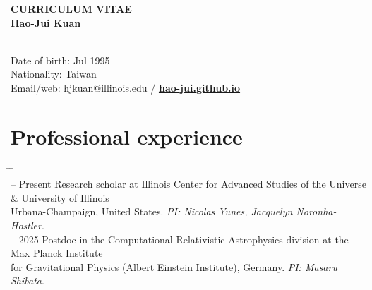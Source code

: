 \documentclass[10pt,floatfix,a4paper]{article}
\begin{document}
\begin{center}
  {\LARGE \bf CURRICULUM VITAE} \\[2ex]
  {\Large \bf Hao-Jui Kuan}
\end{center}

\begin{tabbing}
  \hspace*{0mm} \= \hspace*{2.3cm} \= \hspace*{10cm} \\[-3ex]
  \> Date of birth\hspace{1.2mm}:   Jul 1995\\
  \> Nationality\hspace{4mm}: \> Taiwan\\
  \> Email/web\hspace{4.3mm}: \> hjkuan@illinois.edu / \href{https://hao-jui.github.io}{\textbf{\textcolor{TuebingenRed}{hao-jui.github.io}}}
\end{tabbing}

\section*{Professional experience}
\begin{tabbing}
  \hspace*{5mm} \= \hspace*{2.3cm} \= \hspace*{10cm} \\[-3ex]
   -- Present \> Research scholar at Illinois Center for Advanced Studies of the Universe \& University of Illinois \\
  \> \> Urbana-Champaign, United States. \textit{PI: Nicolas Yunes, Jacquelyn Noronha-Hostler}. \\
   -- 2025 \> Postdoc in the Computational Relativistic Astrophysics division at the Max Planck Institute \\
  \> \> for Gravitational Physics (Albert Einstein Institute), Germany. \textit{PI: Masaru Shibata}.
\end{tabbing}
\end{document}
